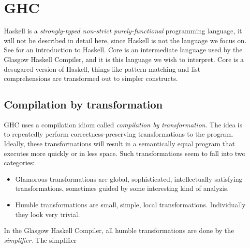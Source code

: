 \section{GHC}

Haskell is a \emph{strongly-typed non-strict purely-functional} programming language, it will not be
described in detail here, since Haskell is not the language we focus on. See \cite{hudak1992report}
for an introduction to Haskell. Core is an intermediate language used by the Glasgow Haskell Compiler\cite{ghc},
and it is this language we wish to interpret. Core is a desugared version of Haskell, things like pattern matching
and list comprehensions are transformed out to simpler constructs.\cite{jones1994compilation}

\subsection{Compilation by transformation}

GHC uses a compilation idiom called \emph{compilation by transformation}. The idea is to repeatedly perform 
correctness-preserving transformations to the program. Ideally, these transformations will result
in a semantically equal program that executes more quickly or in less space. Such transformations seem
to fall into two categories:

\begin{itemize} 
\item{Glamorous transformations} are global, sophisticated, intellectually satisfying transformations,
sometimes guided by some interesting kind of analyzis.
\item{Humble transformations} are small, simple, local transformations. Individually they look very trivial.
\end{itemize}

In the Glasgow Haskell Compiler, all humble transformations are done by the \emph{simplifier}. 
\cite{jones1994compilation} The simplifier

